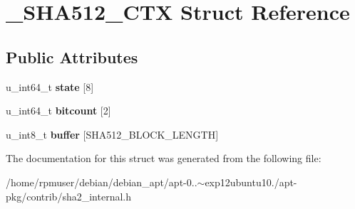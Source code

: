\section{\-\_\-\-S\-H\-A512\-\_\-\-C\-T\-X \-Struct \-Reference}
\label{struct__SHA512__CTX}
\subsection*{\-Public \-Attributes}
\begin{DoxyCompactItemize}
\item 
u\-\_\-int64\-\_\-t {\bfseries state} [8]\label{struct__SHA512__CTX_a62b9d2d516bab6ae1753e695c829b2df}

\item 
u\-\_\-int64\-\_\-t {\bfseries bitcount} [2]\label{struct__SHA512__CTX_ad4fe1f3a5cbb9fa2169da8d1f43ec000}

\item 
u\-\_\-int8\-\_\-t {\bfseries buffer} [\-S\-H\-A512\-\_\-\-B\-L\-O\-C\-K\-\_\-\-L\-E\-N\-G\-T\-H]\label{struct__SHA512__CTX_a44f6438225a161c7cbbc5e11d3a92a80}

\end{DoxyCompactItemize}


\-The documentation for this struct was generated from the following file\-:\begin{DoxyCompactItemize}
\item 
/home/rpmuser/debian/debian\-\_\-apt/apt-\/0..$\sim$exp12ubuntu10./apt-\/pkg/contrib/sha2\-\_\-internal.\-h\end{DoxyCompactItemize}
